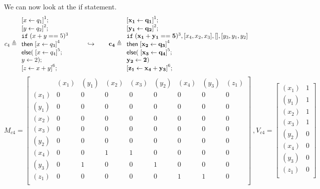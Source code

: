 \documentclass[a4paper,11pt]{article}
\begin{document}
We can now look at the if statement.
\[ c_4 \triangleq
\begin{array}{l}
   \left[ x \leftarrow q_1 \right]^1; \\
   \left[y \leftarrow q_2\right]^2 ; \\
    \eif \;( x + y == 5 )^3\; \\
    \mathsf{then} \;\left[ x \leftarrow q_3 \right]^4 \; \\
    \mathsf{else} (\;\left[ x \leftarrow q_4 \right]^5 ; \\
    y \leftarrow 2 ) ;\\
   \left[ z \leftarrow x +y \right]^6; \\
\end{array}
\hspace{20pt} \hookrightarrow \hspace{20pt}
%
 \ssa{c_4} \triangleq
\begin{array}{l}
   \left[ \ssa{ x_1 \leftarrow q_1} \right]^1; \\
   \left[\ssa{ y_1 \leftarrow q_2} \right]^2 ; \\
    \eif \;( \ssa{ x_1 + y_1 == 5} )^3, [ x_4,x_2,x_3 ],[] ,[y_3,y_1,y_2 ]\; \\
    \mathsf{then} \;\left[ \ssa{ x_2 \leftarrow q_3}\right]^4 \; \\
    \mathsf{else} (\;\left[ \ssa{x_3 \leftarrow q_4} \right]^5 ; \\
     \ssa{y_2 \leftarrow 2} ) \\
   \left[ \ssa{ z_1 \leftarrow x_4 +y_3 }\right]^6; \\
\end{array}
\]
\[
M_{c4} =  \left[ \begin{matrix}
 & (x_1) & (y_1) & (x_2) & (x_3)  & (y_2) & (x_4) & (y_3) & (z_1)  \\
(x_1) & 0 & 0 & 0 & 0 & 0 & 0 & 0 &0  \\
(y_1) & 0 & 0 & 0 & 0 & 0 & 0 & 0&0\\
(x_2) & 0 & 0 & 0 & 0 & 0 & 0& 0& 0 \\
(x_3) & 0 & 0 & 0 & 0 & 0 & 0 & 0& 0\\
(y_2) & 0 & 0 & 0 & 0 & 0 & 0 & 0 & 0 \\
(x_4) & 0 & 0 & 1 & 1 & 0 & 0 & 0 &0\\
(y_3) & 0 & 1 & 0 & 0 & 1 & 0 & 0 &0\\
(z_1) & 0 & 0 & 0 & 0 & 0 & 1 & 1 & 0  \\
\end{matrix} \right] ~ , V_{c4} = \left [ \begin{matrix}
(x_1) &  1 \\
(y_1) & 1 \\
(x_2) & 1 \\
(x_3) &  1 \\
(y_2) & 0 \\
(x_4) & 0 \\
(y_3) &  0 \\
(z_1) &  0 \\
\end{matrix} \right ]
\]
\end{document}

